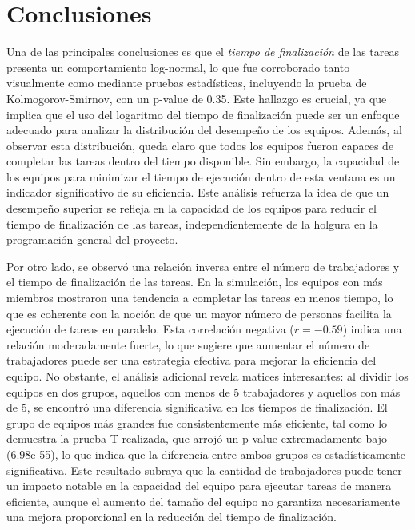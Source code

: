 \documentclass[a4paper, 12pt]{article}
\begin{document}
\section{Conclusiones}
Una de las principales conclusiones es que el \emph{tiempo de finalización} de las tareas presenta un comportamiento log-normal, lo que fue corroborado tanto visualmente como mediante pruebas estadísticas, incluyendo la prueba de Kolmogorov-Smirnov, con un p-value de 0.35. Este hallazgo es crucial, ya que implica que el uso del logaritmo del tiempo de finalización puede ser un enfoque adecuado para analizar la distribución del desempeño de los equipos. Además, al observar esta distribución, queda claro que todos los equipos fueron capaces de completar las tareas dentro del tiempo disponible. Sin embargo, la capacidad de los equipos para minimizar el tiempo de ejecución dentro de esta ventana es un indicador significativo de su eficiencia. Este análisis refuerza la idea de que un desempeño superior se refleja en la capacidad de los equipos para reducir el tiempo de finalización de las tareas, independientemente de la holgura en la programación general del proyecto.

Por otro lado, se observó una relación inversa entre el número de trabajadores y el tiempo de finalización de las tareas. En la simulación, los equipos con más miembros mostraron una tendencia a completar las tareas en menos tiempo, lo que es coherente con la noción de que un mayor número de personas facilita la ejecución de tareas en paralelo. Esta correlación negativa (\(r = -0.59\)) indica una relación moderadamente fuerte, lo que sugiere que aumentar el número de trabajadores puede ser una estrategia efectiva para mejorar la eficiencia del equipo. No obstante, el análisis adicional revela matices interesantes: al dividir los equipos en dos grupos, aquellos con menos de 5 trabajadores y aquellos con más de 5, se encontró una diferencia significativa en los tiempos de finalización. El grupo de equipos más grandes fue consistentemente más eficiente, tal como lo demuestra la prueba T realizada, que arrojó un p-value extremadamente bajo (6.98e-55), lo que indica que la diferencia entre ambos grupos es estadísticamente significativa. Este resultado subraya que la cantidad de trabajadores puede tener un impacto notable en la capacidad del equipo para ejecutar tareas de manera eficiente, aunque el aumento del tamaño del equipo no garantiza necesariamente una mejora proporcional en la reducción del tiempo de finalización.
\end{document}
